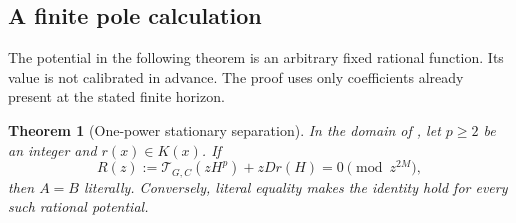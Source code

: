 \documentclass[11pt,a4paper]{amsart}
\numberwithin{equation}{section}
\theoremstyle{plain}
\newtheorem{theorem}{Theorem}[section]
\theoremstyle{definition}
\begin{document}
\subsection{A finite pole calculation}

The potential in the following theorem is an arbitrary fixed rational
function.  Its value is not calibrated in advance.  The proof uses only
coefficients already present at the stated finite horizon.

\begin{theorem}[One-power stationary separation]\label{sc:positive-power}
In the domain of , let \(p\ge2\) be an integer and
\(r(x)\in K(x)\).  If
\begin{equation}\label{sc:power-equation}
 R(z):=\mathcal T_{G,C}(zH^p)+zD r(H)=0\pmod {z^{2M}},
\end{equation}
then \(A=B\) literally.  Conversely, literal equality makes the identity
hold for every such rational potential.
\end{theorem}
\end{document}
